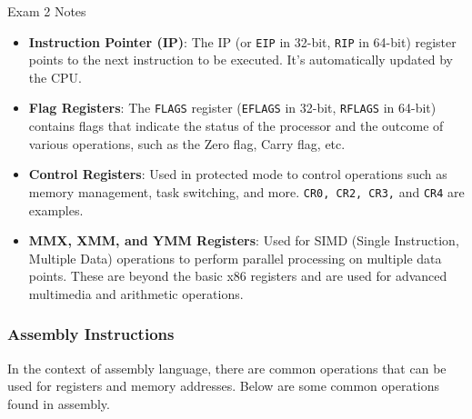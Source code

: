 \begin{examnotes}{Exam 2 Notes}
\begin{itemize}
        \item \textbf{Instruction Pointer (IP)}: The IP (or \texttt{EIP} in 32-bit, \texttt{RIP} in 64-bit) register points to the next instruction to be executed. It's automatically updated by the CPU.
        \item \textbf{Flag Registers}: The \texttt{FLAGS} register (\texttt{EFLAGS} in 32-bit, \texttt{RFLAGS} in 64-bit) contains flags that indicate the status of the processor and the outcome of 
        various operations, such as the Zero flag, Carry flag, etc.
        \item \textbf{Control Registers}: Used in protected mode to control operations such as memory management, task switching, and more. \texttt{CR0, CR2, CR3,} and \texttt{CR4} are examples.
        \item \textbf{MMX, XMM, and YMM Registers}: Used for SIMD (Single Instruction, Multiple Data) operations to perform parallel processing on multiple data points. These are beyond the basic x86 
        registers and are used for advanced multimedia and arithmetic operations.
    \end{itemize}

    \subsubsection*{Assembly Instructions}

    In the context of assembly language, there are common operations that can be used for registers and memory addresses. Below are some common operations found in assembly.


\end{examnotes}
